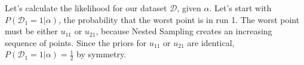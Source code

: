 \documentclass[a4paper, 11pt]{article}
\begin{document}
Let's calculate the likelihood for our dataset $\mathcal{D}$, given $\alpha$.
Let's start with $P(\mathcal{D}_1 = 1 | \alpha)$, the probability that the
worst point is in run 1. The worst point must be either
$u_{11}$ or $u_{21}$, because Nested Sampling creates an increasing sequence
of points. Since the priors for $u_{11}$ or $u_{21}$ are identical,
$P(\mathcal{D}_1 = 1 | \alpha) = \frac{1}{2}$ by symmetry.
\end{document}
